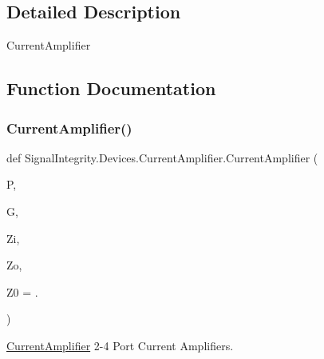 \subsection{Detailed Description}
\begin{DoxyVerb}CurrentAmplifier\end{DoxyVerb}
 

\subsection{Function Documentation}
\mbox{\label{namespaceSignalIntegrity_1_1Devices_1_1CurrentAmplifier_a207696af6011d62d2e67b021e95f66a4}} 
\subsubsection{\texorpdfstring{Current\+Amplifier()}{CurrentAmplifier()}}
{\footnotesize\ttfamily def Signal\+Integrity.\+Devices.\+Current\+Amplifier.\+Current\+Amplifier (\begin{DoxyParamCaption}\item[{}]{P,  }\item[{}]{G,  }\item[{}]{Zi,  }\item[{}]{Zo,  }\item[{}]{Z0 = {.} }\end{DoxyParamCaption})}



\hyperlink{namespaceSignalIntegrity_1_1Devices_1_1CurrentAmplifier}{Current\+Amplifier} 2-\/4 Port Current Amplifiers. 


